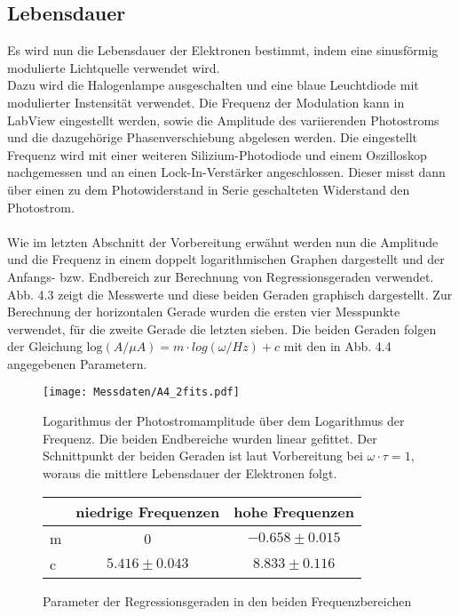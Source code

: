 \subsection{Lebensdauer}

Es wird nun die Lebensdauer der Elektronen bestimmt, indem eine sinusförmig modulierte Lichtquelle verwendet wird. \\
Dazu wird die Halogenlampe ausgeschalten und eine blaue Leuchtdiode mit modulierter Instensität verwendet. Die Frequenz der Modulation kann in LabView eingestellt werden, sowie die Amplitude des variierenden Photostroms und die dazugehörige Phasenverschiebung abgelesen werden. Die eingestellt Frequenz wird mit einer weiteren Silizium-Photodiode und einem Oszilloskop nachgemessen und an einen Lock-In-Verstärker angeschlossen. Dieser misst dann über einen zu dem Photowiderstand in Serie geschalteten Widerstand den Photostrom. \\
\\
Wie im letzten Abschnitt der Vorbereitung erwähnt werden nun die Amplitude und die Frequenz in einem doppelt logarithmischen Graphen dargestellt und der Anfangs- bzw. Endbereich zur Berechnung von Regressionsgeraden verwendet. \\
Abb. 4.3 zeigt die Messwerte und diese beiden Geraden graphisch dargestellt. Zur Berechnung der horizontalen Gerade wurden die ersten vier Messpunkte verwendet, für die zweite Gerade die letzten sieben. 
Die beiden Geraden folgen der Gleichung $\mathrm{log} (A / \mu A) = m \cdot log(\omega / Hz) + c$ mit den in Abb. 4.4 angegebenen Parametern. \\

\begin{figure}
\label{A4_reg}
\centering
\texttt{[image: Messdaten/A4\_2fits.pdf]}
\caption{Logarithmus der Photostromamplitude über dem Logarithmus der Frequenz. Die beiden Endbereiche wurden linear gefittet. Der Schnittpunkt der beiden Geraden ist laut Vorbereitung bei $\omega \cdot \tau = 1$, woraus die mittlere Lebensdauer der Elektronen folgt.}
\end{figure}


\begin{figure}
\label{A4_param}
\caption{Parameter der Regressionsgeraden in den beiden Frequenzbereichen}
\vspace{0.4cm}
\begin{tabular}{lcc}
& niedrige Frequenzen & hohe Frequenzen \\ 
\hline
\hline
m & 0 & $-0.658 \pm 0.015$\\
c & $5.416 \pm 0.043$ & $8.833 \pm 0.116$ \\
\end{tabular}
\end{figure}

